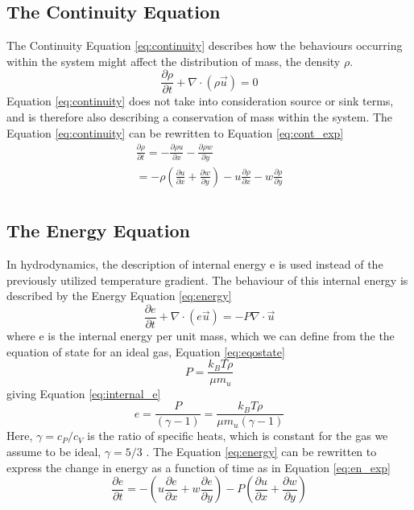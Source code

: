 \documentclass[10pt, nofootinbib, twocolumn]{revtex4-1}
\begin{document}
\subsection{The Continuity Equation}
The Continuity Equation \eqref{eq:continuity} describes how the behaviours occurring within the system might affect the distribution of mass, the density $\rho$. 
\begin{equation}\label{eq:continuity}
    \frac{\partial \rho}{\partial t}+\nabla \cdot (\rho \vec{u})=0
\end{equation}
Equation \eqref{eq:continuity} does not take into consideration source or sink terms, and is therefore also describing a conservation of mass within the system. The Equation \eqref{eq:continuity} can be rewritten to Equation \eqref{eq:cont_exp}
\begin{equation}\label{eq:cont_exp}
\begin{split}
    \frac{\partial \rho}{\partial t}=-\frac{\partial \rho u}{\partial x} -\frac{\partial \rho w}{\partial y} \\
     = -\rho\left( \frac{\partial u}{\partial x} +\frac{\partial w}{\partial y} \right)-u\frac{\partial \rho }{\partial x}-w\frac{\partial \rho }{\partial y} \\
\end{split}
\end{equation}


\subsection{The Energy Equation}
In hydrodynamics, the description of internal energy e is used instead of the previously utilized temperature gradient. The behaviour of this internal energy is described by the Energy Equation \eqref{eq:energy} \cite {ast}
\begin{equation}\label{eq:energy}
    \frac{\partial e}{\partial t}+\nabla \cdot (e \vec{u})=-P\nabla \cdot \vec{u}
\end{equation}
where e is the internal energy per unit mass, which we can define from the the equation of state for an ideal gas, Equation \eqref{eq:eqostate}
\begin{equation}\label{eq:eqostate}
    P=\frac{k_BT\rho}{\mu m_u}
\end{equation}
giving Equation \eqref{eq:internal_e}
\begin{equation}\label{eq:internal_e}
    e=\frac{P}{(\gamma-1)}=\frac{k_BT\rho}{\mu m_u(\gamma -1)}
\end{equation}
Here, $\gamma = c_P / c_V$ is the ratio of specific heats, which is constant for the gas we assume to be ideal, $\gamma = 5/3$ \cite[p.~58]{ast}.
The Equation \eqref{eq:energy} can be rewritten to express the change in energy as a function of time as in Equation \eqref{eq:en_exp}
\begin{equation}\label{eq:en_exp}
    \frac{\partial e}{\partial t}=-\left( u\frac{\partial e}{\partial x} +w\frac{\partial e}{\partial y} \right)- P \left( \frac{\partial u}{\partial x} +\frac{\partial w}{\partial y} \right)
\end{equation}
\end{document}
